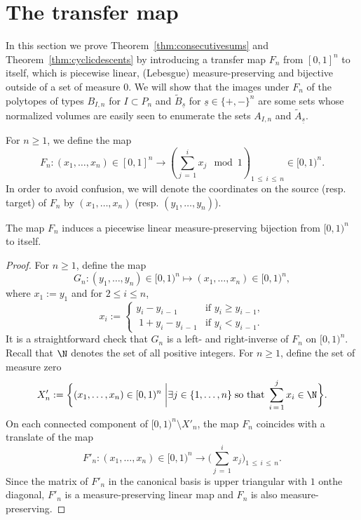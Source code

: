 \section{The transfer map}\label{sec:transfermap}

In this section we prove Theorem~\ref{thm:consecutivesums} and Theorem~\ref{thm:cyclicdescents} by introducing a transfer map $F_n$ from $[0,1]^n$ to itself, which is piecewise linear, (Lebesgue) measure-preserving and bijective outside of a set of measure $0$. We will show that the images under $F_n$ of the polytopes of types $B_{I,n}$ for $I\subset P_{n}$ and $\widetilde{B}_{\underline{s}}$ for $\underline{s}\in \{+,-\}^n$ are some sets whose normalized volumes are easily seen to enumerate the sets $A_{I,n}$ and $\widetilde{A}_{\underline{s}}$.

For $n\geq1$, we define the map
\[
F_n:(x_1,\ldots,x_n)\in[0,1]^n \rightarrow \left(\sum_{j\,=\,1}^i x_j \mod 1 \right)_{\!1\,\leq\,i\,\leq\,n}\!\in [0,1)^n.
\]
In order to avoid confusion, we will denote the coordinates on the source (resp. target) of $F_n$ by $(x_1,\ldots,x_n)$ (resp. $(y_1,\ldots,y_n)$).

\begin{lemm}\label{lem:measurepreserving}
The map $F_n$ induces a piecewise linear measure-preserving bijection from $[0,1)^n$ to itself.
\end{lemm}

\begin{proof}
For $n\geq1$, define the map
\[
G_n:(y_1,\ldots,y_n)\in[0,1)^n \mapsto (x_1,\ldots,x_n) \in [0,1)^n,
\]
where $x_1:=y_1$ and for $2 \leq i \leq n$,
\[
x_i:=
\begin{cases}
y_i-y_{i\,-\,1} &\text{if } y_i \geq y_{i\,-\,1}, \\
\;1+ y_i-y_{i\,-\,1} &\text{if } y_i < y_{i\,-\,1}.
\end{cases}
\]
It is a straightforward check that $G_n$ is a left- and right-inverse of $F_n$ on $[0,1)^n$. Recall that $\N$ denotes the set of all positive integers. For $n\geq 1$, define the set of measure zero
\[
X'_n:=\bigg\{(x_1,\ldots,x_n)\in[0,1)^n \; {\bigg |} \exists j \in\{1,\ldots,n\} \; \text{so that} \; \sum_{i\,=\,1}^j x_i \in \N \bigg\}.
\]
On each connected component of $[0,1)^n \setminus X'_n$, the map $F_n$ coincides with a translate of the map
\[
F'_n:(x_1,\ldots,x_n)\in[0,1)^n \rightarrow \Bigg(\sum_{j\,=\,1}^i x_j \Bigg)_{1\,\leq\,i\,\leq\,n}.
\]
Since the matrix of $F'_n$ in the canonical basis is upper triangular with $1$ on\linebreak the diagonal, $F'_n$ is a measure-preserving linear map and $F_n$ is also measure-\linebreak preserving.
\end{proof}

